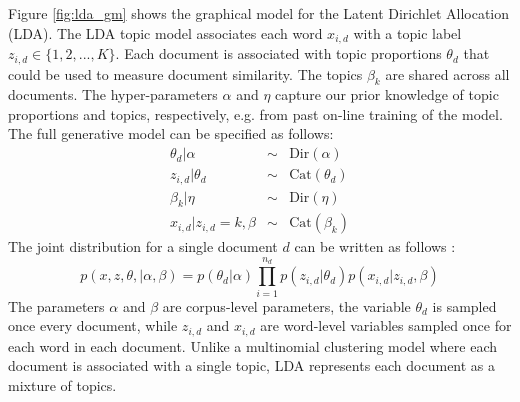 Figure \ref{fig:lda_gm} shows the graphical model for the Latent Dirichlet Allocation (LDA). The LDA topic model associates each word $x_{i,d}$ with a topic label $z_{i,d} \in \{1,2,...,K\}$. Each document is associated with topic proportions $\theta_d$ that could be used to measure document similarity. The topics $\beta_k$ are shared across all documents. The hyper-parameters $\alpha$ and $\eta$ capture our prior knowledge of topic proportions and topics, respectively, e.g. from past on-line training of the model. The full generative model can be specified as follows:
\begin{eqnarray}
    \theta_d | \alpha &\sim& \mathrm{Dir}(\alpha)\\
    z_{i,d} | \theta_d &\sim& \mathrm{Cat}(\theta_d)\\
    \beta_k | \eta &\sim& \mathrm{Dir}(\eta)\\
    x_{i,d}|z_{i,d}=k,\beta &\sim& \mathrm{Cat}(\beta_k)
\end{eqnarray}
The joint distribution for a single document $d$ can be written as follows \cite{Blei2003}:
\begin{equation}
    p(x,z,\theta,|\alpha,\beta) = p(\theta_d|\alpha)\prod_{i=1}^{n_d}p(z_{i,d}|\theta_d)p(x_{i,d}|z_{i,d},\beta) 
\end{equation}
The parameters $\alpha$ and $\beta$ are corpus-level parameters, the variable $\theta_d$ is sampled once every document, while $z_{i,d}$ and $x_{i,d}$ are word-level variables sampled once for each word in each document. Unlike a multinomial clustering model where each document is associated with a single topic, LDA represents each document as a mixture of topics.\\

